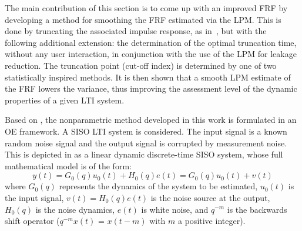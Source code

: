\label{sec:nonparametric:truncation}


The main contribution of this section is to come up with an improved \gls{FRF} by developing a method for smoothing the \gls{FRF} estimated via the \gls{LPM}. 
This is done by truncating the associated impulse response, as in~\citep{Schoukens1998}, but with the following additional extension: the determination of the optimal truncation time, without any user interaction, in conjunction with the use of the \gls{LPM} for leakage reduction. 
The truncation point (cut-off index) is determined by one of two statistically inspired methods.
It is then shown that a smooth \gls{LPM} estimate of the \gls{FRF} lowers the variance, thus improving the assessment level of the dynamic properties of a given \gls{LTI} system.

Based on \citep{Schoukens2009LPM}, the nonparametric method developed in this work is formulated in an \gls{OE} framework. 
A \gls{SISO} \gls{LTI} system is considered.
The input signal is a known random noise signal and the output signal is corrupted by measurement noise. This is depicted in  as a linear dynamic discrete-time \gls{SISO} system, whose full mathematical model is of the form:
\begin{equation}\label{eq:nparam:trunc:LPM:TD}
y(t)=G_0(q)u_0(t)+H_0(q)e(t)=G_0(q)u_0(t)+v(t)
\end{equation}
where $G_0(q)$ represents the dynamics of the system to be estimated, $u_0(t)$ is the input signal, $v(t)= H_0(q)e(t)$ is the noise source at the output, $H_0(q)$ is the noise dynamics, $e(t)$ is white noise, and $q^{-m}$ is the backwards shift operator ($q^{-m}x(t)$ = $x(t-m)$  with $m$ a positive integer).

